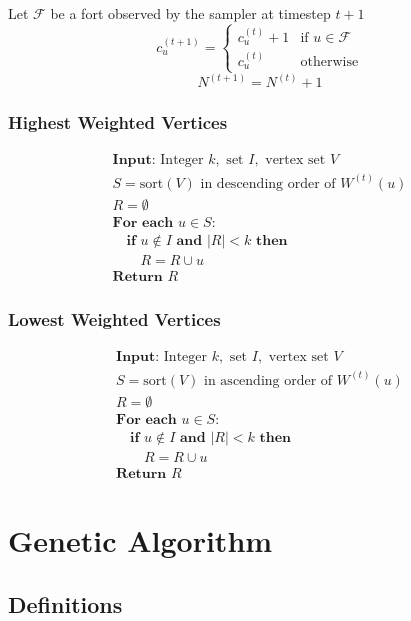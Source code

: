 \documentclass[11pt]{article}
\begin{document}
Let $\mathcal{F}$ be a fort observed by the sampler at timestep $t + 1$
$$c_u^{(t+1)} = \begin{cases} c_u^{(t)} + 1 & \text{if } u \in \mathcal{F} \\ c_u^{(t)} & \text{otherwise} \end{cases}$$
$$N^{(t+1)} = N^{(t)} + 1$$

\subsubsection{Highest Weighted Vertices}

$$\begin{array}{l}
\textbf{Input:} \text{ Integer } k, \text{ set } I, \text{ vertex set } V \\
S = \text{sort}(V) \text{ in descending order of } W^{(t)}(u) \\
R = \emptyset \\
\textbf{For each } u \in S: \\
\quad \textbf{if } u \notin I \textbf{ and } |R| < k \textbf{ then} \\
\quad \quad R = R \cup {u} \\
\textbf{Return } R
\end{array}$$

\subsubsection{Lowest Weighted Vertices}

$$\begin{array}{l}
\textbf{Input:} \text{ Integer } k, \text{ set } I, \text{ vertex set } V \\
S = \text{sort}(V) \text{ in ascending order of } W^{(t)}(u) \\
R = \emptyset \\
\textbf{For each } u \in S: \\
\quad \textbf{if } u \notin I \textbf{ and } |R| < k \textbf{ then} \\
\quad \quad R = R \cup {u} \\
\textbf{Return } R
\end{array}$$

\section{Genetic Algorithm}

\subsection{Definitions}
\end{document}
